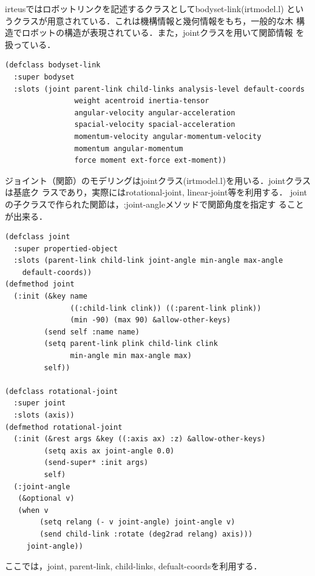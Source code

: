 irteusではロボットリンクを記述するクラスとしてbodyset-link(irtmodel.l)
というクラスが用意されている．これは機構情報と幾何情報をもち，一般的な木
構造でロボットの構造が表現されている．また，jointクラスを用いて関節情報
を扱っている．

{\baselineskip=10pt
\begin{verbatim}
(defclass bodyset-link
  :super bodyset
  :slots (joint parent-link child-links analysis-level default-coords
                weight acentroid inertia-tensor
                angular-velocity angular-acceleration
                spacial-velocity spacial-acceleration
                momentum-velocity angular-momentum-velocity
                momentum angular-momentum
                force moment ext-force ext-moment))
\end{verbatim}
}

ジョイント（関節）のモデリングはjointクラス(irtmodel.l)を用いる．jointクラスは基底ク
ラスであり，実際にはrotational-joint, linear-joint等を利用する．
jointの子クラスで作られた関節は，:joint-angleメソッドで関節角度を指定す
ることが出来る．

{\baselineskip=10pt
\begin{verbatim}
(defclass joint
  :super propertied-object
  :slots (parent-link child-link joint-angle min-angle max-angle
	default-coords))
(defmethod joint
  (:init (&key name
               ((:child-link clink)) ((:parent-link plink))
               (min -90) (max 90) &allow-other-keys)
         (send self :name name)
         (setq parent-link plink child-link clink
               min-angle min max-angle max)
         self))

(defclass rotational-joint
  :super joint
  :slots (axis))
(defmethod rotational-joint
  (:init (&rest args &key ((:axis ax) :z) &allow-other-keys)
         (setq axis ax joint-angle 0.0)
         (send-super* :init args)
         self)
  (:joint-angle
   (&optional v)
   (when v
        (setq relang (- v joint-angle) joint-angle v)
        (send child-link :rotate (deg2rad relang) axis)))
     joint-angle))
\end{verbatim}
}

ここでは，joint, parent-link, child-links, defualt-coordsを利用する．

